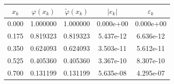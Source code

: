 \begin{tabular}{ccccc}
\toprule
$x_k$ & $\varphi(x_k)$ & $\tilde\varphi(x_k)$ & $|e_k|$ & $\varepsilon_k$ \\
\midrule
0.000 & 1.000000 & 1.000000 & 0.000e+00 & 0.000e+00 \\
0.175 & 0.819323 & 0.819323 & 5.437e-12 & 6.636e-12 \\
0.350 & 0.624093 & 0.624093 & 3.503e-11 & 5.612e-11 \\
0.525 & 0.405360 & 0.405360 & 3.367e-10 & 8.307e-10 \\
0.700 & 0.131199 & 0.131199 & 5.635e-08 & 4.295e-07 \\
\bottomrule
\end{tabular}